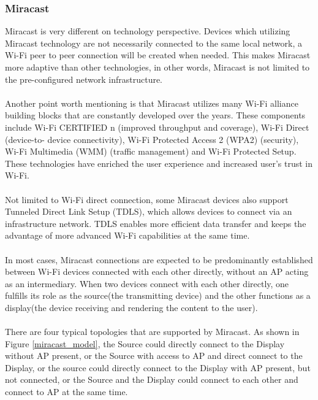 \subsubsection{Miracast} %
Miracast \cite{miracast_industry} is very different on technology perspective.
Devices which utilizing Miracast technology are not necessarily connected to
the same local network, a Wi-Fi peer to peer connection will be created when
needed. This makes Miracast more adaptive than other technologies, in other
words, Miracast is not limited to the pre-configured network infrastructure.\\
\\
Another point worth mentioning is that Miracast utilizes many Wi-Fi alliance
building blocks that are constantly developed over the years. These components
include Wi-Fi CERTIFIED n (improved throughput and coverage), Wi-Fi Direct
(device-to- device connectivity), Wi-Fi Protected Access 2 (WPA2) (security),
Wi-Fi Multimedia (WMM) (traffic management) and Wi-Fi Protected Setup. These
technologies have enriched the user experience and increased user's trust in
Wi-Fi.\\
\\
Not limited to Wi-Fi direct connection, some Miracast devices also support Tunneled Direct Link Setup (TDLS), which allows devices to connect via an infrastructure network. TDLS enables more efficient data transfer and keeps the advantage of more advanced Wi-Fi capabilities at the same time.\\
\\
In most cases, Miracast connections are expected to be predominantly established between Wi-Fi devices connected with each other directly, without an AP acting as an intermediary. When two devices connect with each other directly, one fulfills its role as the source(the transmitting device) and the other functions as a display(the device receiving and rendering the content to the user).\\
\\
There are four typical topologies that are supported by Miracast. As shown in
Figure \ref{miracast_model}, the Source could directly connect to the Display
without AP present, or the Source with access to AP and direct connect to the Display, or the source could directly
connect to the Display with AP present, but not connected, or the Source and
the Display could connect to each other and connect to AP at the same time.\\
